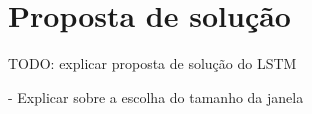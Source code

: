 \section{Proposta de solução}


TODO: explicar proposta de solução do LSTM

- Explicar sobre a escolha do tamanho da janela